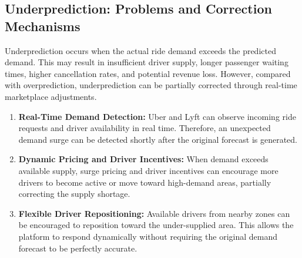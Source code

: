 \documentclass{article}
\begin{document}
\subsection{Underprediction: Problems and Correction Mechanisms}


Underprediction occurs when the actual ride demand exceeds the predicted demand. 
This may result in insufficient driver supply, longer passenger waiting times, 
higher cancellation rates, and potential revenue loss. However, compared with 
overprediction, underprediction can be partially corrected through real-time 
marketplace adjustments.

\begin{enumerate}
    \item \textbf{Real-Time Demand Detection:} 
    Uber and Lyft can observe incoming ride requests and driver availability in 
    real time. Therefore, an unexpected demand surge can be detected shortly 
    after the original forecast is generated.

    \item \textbf{Dynamic Pricing and Driver Incentives:} 
    When demand exceeds available supply, surge pricing and driver incentives 
    can encourage more drivers to become active or move toward high-demand areas, 
    partially correcting the supply shortage.

    \item \textbf{Flexible Driver Repositioning:} 
    Available drivers from nearby zones can be encouraged to reposition toward 
    the under-supplied area. This allows the platform to respond dynamically 
    without requiring the original demand forecast to be perfectly accurate.
\end{enumerate}
\end{document}
